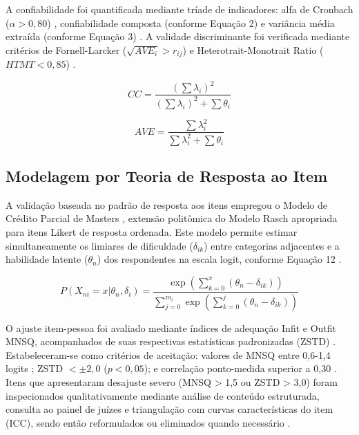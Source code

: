 A confiabilidade foi quantificada mediante tríade de indicadores: alfa de Cronbach ($\alpha > 0,80$) \cite{Cronbach1951}, confiabilidade composta (conforme Equação 2) e variância média extraída (conforme Equação 3) \cite{Fornell1981}. A validade discriminante foi verificada mediante critérios de Fornell-Larcker ($\sqrt{AVE_i} > r_{ij}$) e Heterotrait-Monotrait Ratio ($HTMT < 0,85$) \cite{Henseler2015}.

\begin{equation}
CC = \frac{(\sum\lambda_i)^2}{(\sum\lambda_i)^2 + \sum\theta_i}
\end{equation}

\begin{equation}
AVE = \frac{\sum\lambda_i^2}{\sum\lambda_i^2 + \sum\theta_i}
\end{equation}

\subsection{Modelagem por Teoria de Resposta ao Item}

A validação baseada no padrão de resposta aos itens empregou o Modelo de Crédito Parcial de Masters \cite{Masters1982}, extensão politômica do Modelo Rasch \cite{Rasch1960} apropriada para itens Likert de resposta ordenada. Este modelo permite estimar simultaneamente os limiares de dificuldade ($\delta_{ik}$) entre categorias adjacentes e a habilidade latente ($\theta_n$) dos respondentes na escala logit, conforme Equação 12 \cite{Bond2020}.

\begin{equation}
P(X_{ni}=x|\theta_n, \delta_i) = \frac{\exp\left(\sum_{k=0}^{x}(\theta_n - \delta_{ik})\right)}{\sum_{j=0}^{m_i}\exp\left(\sum_{k=0}^{j}(\theta_n - \delta_{ik})\right)}
\end{equation} 

O ajuste item-pessoa foi avaliado mediante índices de adequação Infit e Outfit MNSQ, acompanhados de suas respectivas estatísticas padronizadas (ZSTD) \cite{Wright1994}. Estabeleceram-se como critérios de aceitação: valores de MNSQ entre 0,6-1,4 logits \cite{Linacre2002}; ZSTD $< \pm 2,0$ ($p < 0,05$); e correlação ponto-medida superior a 0,30 \cite{Bond2020}. Itens que apresentaram desajuste severo (MNSQ > 1,5 ou ZSTD > 3,0) foram inspecionados qualitativamente mediante análise de conteúdo estruturada, consulta ao painel de juízes e triangulação com curvas características do item (ICC), sendo então reformulados ou eliminados quando necessário \cite{Wilson2005}.


